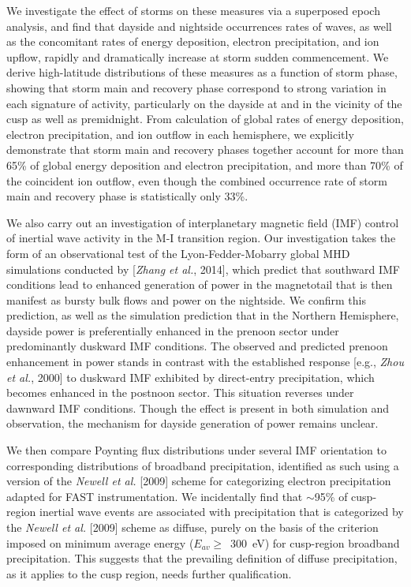 We investigate the effect of storms on these measures via a superposed
epoch analysis, and find that dayside and nightside occurrences rates
of \Alf waves, as well as the concomitant rates of energy deposition,
electron precipitation, and ion upflow, rapidly and dramatically
increase at storm sudden commencement. We derive high-latitude
distributions of these measures as a function of storm phase, showing
that storm main and recovery phase correspond to strong variation in
each signature of \Alfic activity, particularly on the dayside at and
in the vicinity of the cusp as well as premidnight. From calculation
of global rates of \Alfic energy deposition, electron precipitation,
and ion outflow in each hemisphere, we explicitly demonstrate that
storm main and recovery phases together account for more than 65\% of
global \Alfic energy deposition and electron precipitation, and more
than 70\% of the coincident ion outflow, even though the combined
occurrence rate of storm main and recovery phase is statistically only
33\%.

We also carry out an investigation of interplanetary magnetic field
(IMF) control of inertial \Alf wave activity in the M-I transition
region. Our investigation takes the form of an observational test of
the Lyon-Fedder-Mobarry global MHD simulations conducted by
[\textsl{Zhang et al.}, 2014], which predict that southward IMF
conditions lead to enhanced generation of power in the magnetotail
that is then manifest as bursty bulk flows and \Alfic power on the
nightside. We confirm this prediction, as well as the simulation
prediction that in the Northern Hemisphere, dayside \Alfic power is
preferentially enhanced in the prenoon sector under predominantly
duskward IMF conditions. The observed and predicted prenoon
enhancement in \Alfic power stands in contrast with the established
response [e.g., \textsl{Zhou et al.}, 2000] to duskward IMF exhibited
by direct-entry precipitation, which becomes enhanced in the postnoon
sector. This situation reverses under dawnward IMF conditions. Though
the effect is present in both simulation and observation, the
mechanism for dayside generation of \Alfic power remains unclear. 

We then compare \Alfic Poynting flux distributions under several IMF
orientation to corresponding distributions of broadband precipitation,
identified as such using a version of the \textsl{Newell et al.}
[2009] scheme for categorizing electron precipitation adapted for FAST
instrumentation. We incidentally find that $\sim$95\% of cusp-region
inertial \Alf wave events are associated with precipitation that is
categorized by the \textsl{Newell et al.} [2009] scheme as diffuse, purely on the
basis of the criterion imposed on minimum average energy ($E_{av}
\geq$~300~eV) for cusp-region broadband precipitation. This suggests
that the prevailing definition of diffuse precipitation, as it applies
to the cusp region, needs further qualification.

